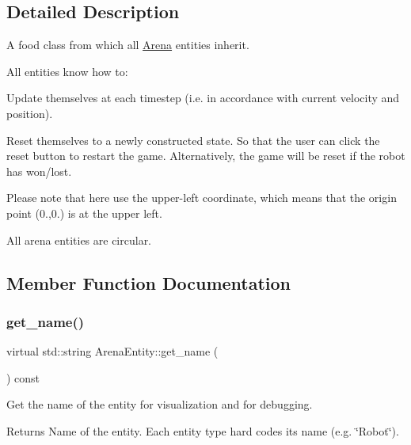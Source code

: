 \subsection{Detailed Description}
A food class from which all \mbox{\hyperlink{class_arena}{Arena}} entities inherit. 

All entities know how to\+:


\begin{DoxyEnumerate}
\item Update themselves at each timestep (i.\+e. in accordance with current velocity and position).
\item Reset themselves to a newly constructed state. So that the user can click the reset button to restart the game. Alternatively, the game will be reset if the robot has won/lost.
\end{DoxyEnumerate}

Please note that here use the upper-\/left coordinate, which means that the origin point (0.,0.) is at the upper left.

All arena entities are circular. 

\subsection{Member Function Documentation}
\mbox{\label{class_arena_entity_ad43152003033cf01ad86eeff1990b69a}} 
\subsubsection{\texorpdfstring{get\+\_\+name()}{get\_name()}}
{\footnotesize\ttfamily virtual std\+::string Arena\+Entity\+::get\+\_\+name (\begin{DoxyParamCaption}{ }\end{DoxyParamCaption}) const\hspace{0.3cm}{\ttfamily [pure virtual]}}



Get the name of the entity for visualization and for debugging. 

\begin{DoxyReturn}{Returns}
Name of the entity. Each entity type hard codes its name (e.\+g. \char`\"{}\+Robot\char`\"{}). 
\end{DoxyReturn}


